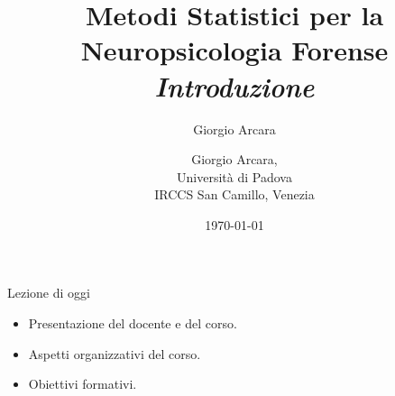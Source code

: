 \documentclass[
  ignorenonframetext,
]{beamer}
\author{Giorgio Arcara}
\date{}
\providecommand{\tightlist}{%
  \setlength{\itemsep}{0pt}\setlength{\parskip}{0pt}}
\begin{document}
\begin{frame}
\title{Metodi Statistici per la Neuropsicologia Forense\\ \vspace{1em} \emph{Introduzione}}
\author{Giorgio Arcara,\\ Università di Padova \\ IRCCS San Camillo, Venezia}

\date{\today}
\maketitle
\end{frame}

\begin{frame}{Lezione di oggi}
\label{lezione-di-oggi}
\begin{itemize}
\tightlist
\item
  Presentazione del docente e del corso.
\item
  Aspetti organizzativi del corso.
\item
  Obiettivi formativi.
\end{itemize}
\end{frame}
\end{document}
